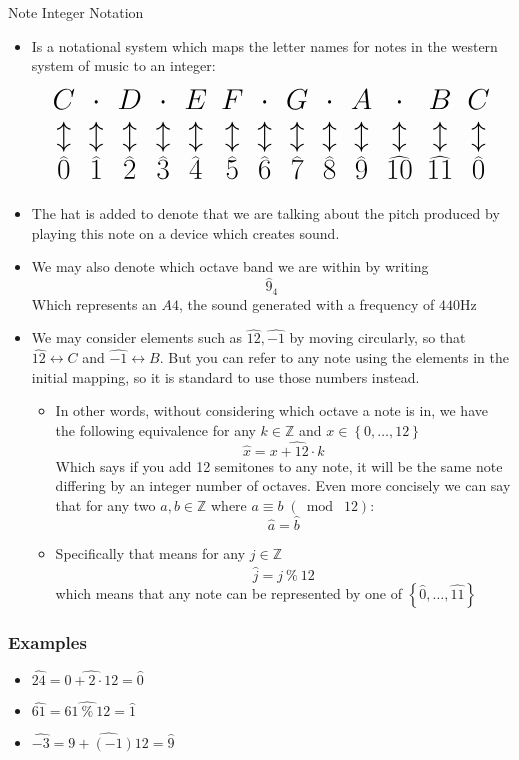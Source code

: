 \documentclass{standalone}
\begin{document}
\begin{defn*}{Note Integer Notation}
  \begin{itemize}
   \item Is a notational system which maps the letter names for notes in the western system of music to an integer: 
\[ 
  \huge
\begin{array}{ccccccccccccc}
    C& \cdot& D& \cdot& E& F& \cdot& G& \cdot& A& \cdot& B & C \\
    \updownarrow & \updownarrow & \updownarrow & \updownarrow & \updownarrow & \updownarrow & \updownarrow & \updownarrow & \updownarrow & \updownarrow & \updownarrow & \updownarrow & \updownarrow \\
    \widehat{0} & \widehat{1} & \widehat{2} & \widehat{3} & \widehat{4} & \widehat{5} & \widehat{6} & \widehat{7} & \widehat{8} & \widehat{9} & \widehat{10} & \widehat{11} & \widehat{0}\\
\end{array} 
\] 
    \item The hat is added to denote that we are talking about the pitch produced by playing this note on a device which creates sound.
    \item We may also denote which octave band we are within by writing 
      \[
      \widehat{9}_{4}
      \]
      Which represents an $A4$, the sound generated with a frequency of $440\text{Hz}$ 
    \item We may consider elements such as $ \widehat{12},  \widehat{-1}$ by moving circularly, so that $ \widehat{12} \leftrightarrow C$ and $ \widehat{-1} \leftrightarrow B$. But you can refer to any note using the elements in the initial mapping, so it is standard to use those numbers instead. 
      \begin{itemize}
        \item In other words, without considering which octave a note is in, we have the following equivalence for any $k \in \mathbb{Z}$ and $x \in \left\{ 0, \ldots, 12 \right\}$ 
        \[
        \widehat{x} = \widehat{x  +  12  \cdot k}
        \]
        Which says if you add 12 semitones to any note, it will be the same note differing by an integer number of octaves. Even more concisely we can say that for any two $a, b \in \mathbb{Z}$ where $a  \equiv b \;(\bmod\; 12) $:
        \[
        \widehat{a} = \widehat{b}
        \]
       \item Specifically that means for any $j \in \mathbb{Z}$ 
         \[
          \widehat{j} = \widehat{j ~\%~ 12}
         \]
         which means that any note can be represented by one of $ \left\{ \widehat{0}, \ldots, \widehat{11} \right\}$ 
      \end{itemize}
  \end{itemize}
  \subsubsection*{Examples}
  \begin{itemize}
    \item $ \widehat{24} = \widehat{0  +  2  \cdot 12} = \widehat{0}$ 
    \item $ \widehat{61} = \widehat{61 ~\%~ 12} = \widehat{1}$ 
    \item $ \widehat{-3} = \widehat{9   +  \left( -1 \right)12} = \widehat{9} $ 
  \end{itemize}
\end{defn*}
\end{document}
